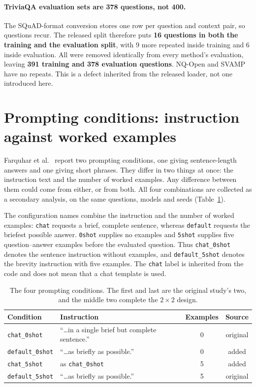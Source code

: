 \paragraph{TriviaQA evaluation sets are 378 questions, not 400.} The
SQuAD-format conversion stores one row per question and context pair, so questions
recur. The released split therefore puts \textbf{16 questions in both the
training and the evaluation split}, with 9 more repeated inside training and 6
inside evaluation. All were removed identically from every method's evaluation,
leaving \textbf{391 training and 378 evaluation questions}. NQ-Open and SVAMP
have no repeats. This is a defect inherited from the released loader, not one
introduced here.

\section{Prompting conditions: instruction against worked examples}
\label{sec:conditions}

Farquhar et al.~\cite{semantic_entropy_nature_2024} report two prompting conditions, one giving \mbox{sentence-length}
answers and one giving short phrases. They differ in two things at once: the
instruction text and the number of worked examples. Any difference between them
could come from either, or from both. All four combinations are collected
as a secondary analysis, on the same questions, models and seeds
(Table~\ref{tab:conditions}).

The configuration names combine the instruction and the number of worked
examples: \texttt{chat} requests a brief, complete sentence, whereas
\texttt{default} requests the briefest possible answer. \texttt{0shot} supplies
no examples and \texttt{5shot} supplies five question--answer examples before
the evaluated question. Thus \texttt{chat\_0shot} denotes the sentence
instruction without examples, and \texttt{default\_5shot} denotes the brevity
instruction with five examples. The \texttt{chat} label is inherited from the
code and does not mean that a chat template is used.

\begin{table}[htb]
\centering
\small
\caption{The four prompting conditions. The first and last are the original
  study's two, and the middle two complete the $2\times2$ design.}
\label{tab:conditions}
\begingroup
\setlength{\tabcolsep}{4pt}
\begin{tabular}{@{}lp{4.7cm}cc@{}}
\toprule
Condition & Instruction & Examples & Source \\
\midrule
\texttt{chat\_0shot} & ``\ldots in a single brief but complete sentence.'' & 0 & original \\
\texttt{default\_0shot} & ``\ldots as briefly as possible.'' & 0 & added \\
\texttt{chat\_5shot} & as \texttt{chat\_0shot} & 5 & added \\
\texttt{default\_5shot} & ``\ldots as briefly as possible.'' & 5 & original \\
\bottomrule
\end{tabular}
\endgroup
\end{table}

